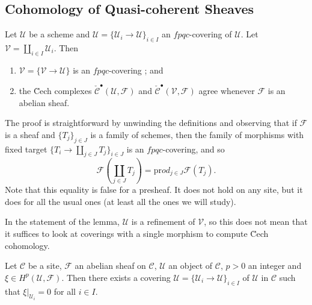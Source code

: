 \subsection{Cohomology of Quasi-coherent Sheaves} %

\label{section:CechCohomology}

\begin{lemma} \label{lem:CechComplexes}
Let $\mathcal{U}$ be a scheme and $\mathcal{U} = \{ \mathcal{U}_i \to \mathcal{U} \}_{i \in I}$ an $fpqc$-covering of $\mathcal{U}$. Let $\mathcal{V} = \coprod_{i \in I} \mathcal{U}_i$. Then
\begin{enumerate}
\item 
$\mathcal{V} = \{ \mathcal{V} \to \mathcal{U} \}$ is an $fpqc$-covering ; and
\item
the \u Cech complexes $\check{\mathcal{C}}^\bullet (\mathcal{U}, \mathcal{F})$ and $\check{\mathcal{C}}^\bullet (\mathcal{V}, \mathcal{F})$ agree whenever $\mathcal{F}$ is an abelian sheaf.
\end{enumerate} 
\end{lemma}

The proof is straightforward by unwinding the definitions and observing that if $\mathcal{F}$ is a sheaf and $\{ T_j \}_{j \in J}$ is a family of schemes, then the family of morphisms with fixed target $\{ T_i \to \coprod_{j \in J} T_j \}_{i \in J}$ is an $fpqc$-covering, and so
$$
\mathcal{F} \left( \coprod_{j \in J} T_j \right) = \text{pr}od_{j \in J} \mathcal{F} (T_j).
$$
Note that this equality is false for a presheaf. It does not hold on any site, but it does for all the usual ones (at least all the ones we will study).

\begin{remark}
In the statement of the lemma, $\mathcal{U}$ is a refinement of $\mathcal{V}$, so this does not mean that it suffices to look at coverings with a single morphism to compute \u Cech cohomology.
\end{remark}

\begin{lemma} \label{lem:LocOfCohomology}
Let $\mathcal{C}$ be a site, $\mathcal{F}$ an abelian sheaf on $\mathcal{C}$, $\mathcal{U}$ an object of $\mathcal{C}$, $p >0$ an integer and $\xi \in H^p(\mathcal{U}, \mathcal{F})$. Then there exists a covering $\mathcal{U} = \{ \mathcal{U}_i \to \mathcal{U} \}_{i \in I}$ of $\mathcal{U}$ in $\mathcal{C}$ such that $\xi |_{\mathcal{U}_i} = 0$ for all $i \in I$.
\end{lemma}

